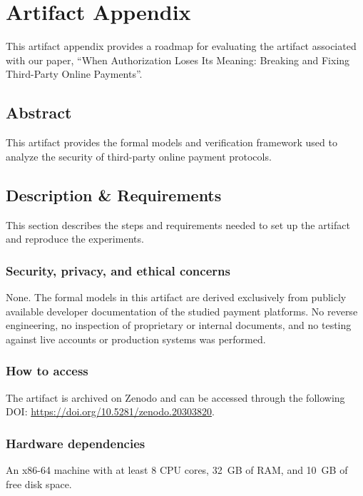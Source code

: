 

\section{Artifact Appendix}
This artifact appendix provides a roadmap for evaluating the artifact
associated with our paper, ``When Authorization Loses Its Meaning: Breaking and 
Fixing Third-Party Online Payments''. 

\subsection{Abstract}
This artifact provides the formal models and verification
framework used to analyze the security of third-party online payment protocols.

\subsection{Description \& Requirements}
This section describes the steps and requirements needed to set up the artifact and reproduce the experiments.

\subsubsection{Security, privacy, and ethical concerns}
None. The formal models in this artifact are derived exclusively from publicly available developer documentation of the studied payment platforms.
No reverse engineering, no inspection of proprietary or internal documents, and no testing against live accounts or production systems was performed.

\subsubsection{How to access}
The artifact is archived on Zenodo and can be accessed through the following DOI: \url{https://doi.org/10.5281/zenodo.20303820}.

\subsubsection{Hardware dependencies}
An x86-64 machine with at least 8 CPU cores, 32~GB of RAM, and 10~GB of free disk space.

